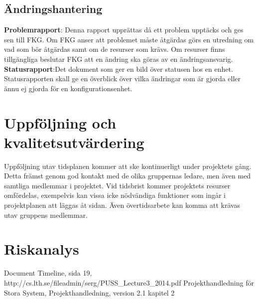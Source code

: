 \documentclass[a4paper]{article}
\begin{document}
\subsection{Ändringshantering}
\textbf{Problemrapport}: Denna rapport upprättas då ett problem upptäcks och ges sen till FKG. Om FKG anser att problemet måste åtgärdas görs en utredning om vad som bör åtgärdas samt om de resurser som krävs. Om resurser finns tillgängliga beslutar FKG att en ändring ska göras av en ändringsansvarig.\\
\textbf{Statusrapport}:Det dokument som ger en bild över statusen hos en enhet. Statusrapporten skall ge en överblick över vilka ändringar som är gjorda eller ännu ej gjorda för en konfigurationsenhet.


\section{Uppföljning och kvalitetsutvärdering}
\begin{comment} 
Det ska finnas en del i projektplanen som beskriver hur uppföljning, tex av tidsplanen, sker under projektet, samt vad som händer om arbetet inte verkar gå enligt plan. Det ska också finnas en beskrivning av de rutiner som finns för kvalitetsutvärdering under projektet.

\end{comment}

Uppföljning utav tidsplanen kommer att ske kontinuerligt under projektets gång. Detta främst genom god kontakt med de olika gruppernas ledare, men även med samtliga medlemmar i projektet. Vid tidsbrist kommer projektets resurser omfördelas, exempelvis kan vissa icke nödvändiga funktioner som ingår i projektplanen att läggas åt sidan. Även övertidsarbete kan komma att krävas utav gruppens medlemmar. %



\section{Riskanalys}
\begin{comment}
I projektplanen ska även resultatet av en riskanalys för projektet presenteras. Ange hur riskanalys utförts i projektet, samt de viktigaste riskerna som identifierats. Rapportera åtminstone följande för varje rapporterad risk: skattad sannolikhet (tex låg, medel, hög), skattad effekt (tex låg, medel, hög), möjliga indikationer på att risken förverkligas, samt exempel på lösningar om risken förverkligas.

\end{comment}
\newpage

\begin{thebibliography}{1}
 Document Timeline, sida 19, http://cs.lth.se/fileadmin/serg/PUSS\_Lecture3\_2014.pdf 
 Projekthandledning för Stora System, Projekthandledning, version 2.1 kapitel 2
\end{thebibliography}
\end{document}
